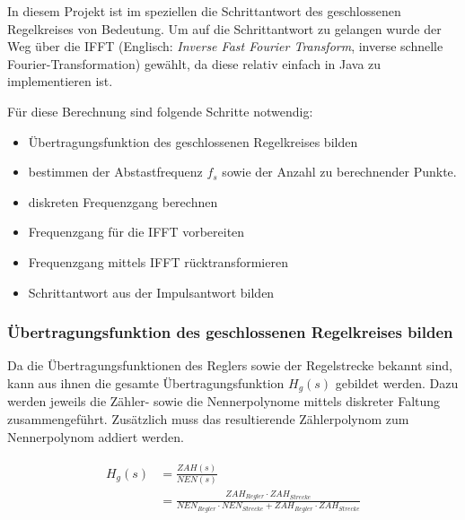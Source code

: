 In  diesem Projekt  ist  im speziellen  die  Schrittantwort des  geschlossenen
Regelkreises von  Bedeutung. Um auf die  Schrittantwort zu gelangen  wurde der
Weg \"uber die IFFT (Englisch:  \emph{Inverse Fast Fourier Transform}, inverse
schnelle Fourier-Transformation)  gew\"ahlt, da diese relativ  einfach in Java
zu implementieren ist.

F\"ur diese Berechnung sind folgende Schritte notwendig:

\begin{itemize}
    \item
        \"Ubertragungsfunktion des geschlossenen Regelkreises bilden
    \item
        bestimmen der Abstastfrequenz $f_s$ sowie der Anzahl zu berechnender Punkte.
    \item
        diskreten Frequenzgang berechnen
    \item
        Frequenzgang f\"ur die IFFT vorbereiten
    \item
        Frequenzgang mittels IFFT r\"ucktransformieren
    \item
        Schrittantwort aus der Impulsantwort bilden
\end{itemize}


\subsubsection*{\"Ubertragungsfunktion des geschlossenen Regelkreises bilden}

Da  die \"Ubertragungsfunktionen  des Reglers  sowie der  Regelstrecke bekannt
sind,  kann aus  ihnen  die gesamte  \"Ubertragungsfunktion $H_g(s)$  gebildet
werden. Dazu  werden jeweils  die Z\"ahler-  sowie die  Nennerpolynome mittels
diskreter  Faltung  zusammengef\"uhrt. Zus\"atzlich   muss  das  resultierende
Z\"ahlerpolynom zum Nennerpolynom addiert werden.

\begin{gather} \label{eq:fft:hg}
    \begin{split}
        H_g(s)  & = \frac{ZAH(s)}{NEN(s)} \\
                & = \frac{ZAH_{Regler} \cdot ZAH_{Strecke}}{NEN_{Regler} \cdot NEN_{Strecke} + ZAH_{Regler} \cdot ZAH_{Strecke}}
    \end{split}
\end{gather}

